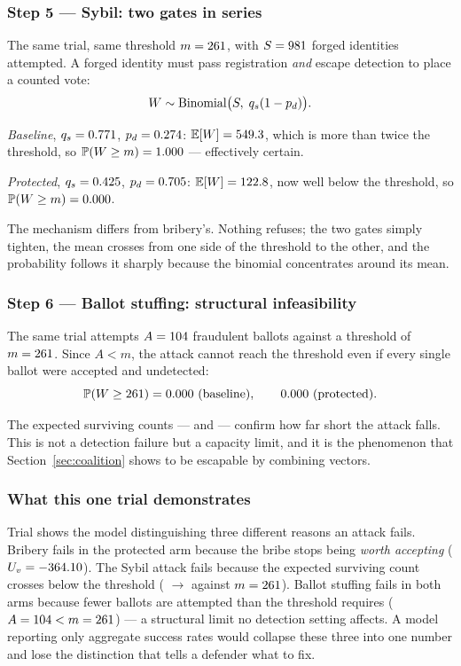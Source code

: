 \subsubsection*{Step 5 --- Sybil: two gates in series}

The same trial, same threshold $m = 261$, with $S = 981$ forged
identities attempted. A forged identity must pass registration
\emph{and} escape detection to place a counted vote:
\[
W \sim \mathrm{Binomial}\big(S,\; q_s(1-p_d)\big).
\]

\emph{Baseline}, $q_s = 0.771$, $p_d = 0.274$:
$\mathbb{E}[W] = 549.3$, which is more than twice the threshold, so
$\mathbb{P}(W \geq m) = 1.000$ --- effectively certain.

\emph{Protected}, $q_s = 0.425$, $p_d = 0.705$:
$\mathbb{E}[W] = 122.8$, now well below the threshold, so
$\mathbb{P}(W \geq m) = 0.000$.

The mechanism differs from bribery's. Nothing refuses; the two gates
simply tighten, the mean crosses from one side of the threshold to the
other, and the probability follows it sharply because the binomial
concentrates around its mean.

\subsubsection*{Step 6 --- Ballot stuffing: structural infeasibility}

The same trial attempts $A = 104$ fraudulent ballots against a
threshold of $m = 261$. Since $A < m$, the attack cannot reach the
threshold even if every single ballot were accepted and undetected:
\[
\mathbb{P}(W \geq 261) = 0.000 \text{ (baseline)},
\qquad
0.000 \text{ (protected)} .
\]

The expected surviving counts --- \WEballotmuBase{} and
\WEballotmuProt{} --- confirm how far short the attack falls. This is
not a detection failure but a capacity limit, and it is the phenomenon
that Section~\ref{sec:coalition} shows to be escapable by combining
vectors.

\subsubsection*{What this one trial demonstrates}

\begin{finding}
Trial \WEtrial{} shows the model distinguishing three different reasons
an attack fails. Bribery fails in the protected arm because the bribe
stops being \emph{worth accepting} ($U_{v} = -364.10$). The Sybil
attack fails because the expected surviving count crosses below the
threshold (\WEsybilmuBase{} $\rightarrow$ \WEsybilmuProt{} against
$m = 261$). Ballot stuffing fails in both arms because fewer ballots
are attempted than the threshold requires ($A = 104 < m = 261$) ---
a structural limit no detection setting affects. A model reporting only
aggregate success rates would collapse these three into one number and
lose the distinction that tells a defender what to fix.
\end{finding}

